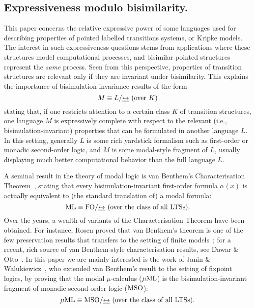 \subsection{Expressiveness modulo bisimilarity.}
%
This paper concerns the relative expressive power of some languages used for
describing properties of pointed labelled transitions systems, or Kripke
models.
The interest in such expressiveness questions stems from applications where
these structures model computational processes, and bisimilar pointed
structures represent the \emph{same} process.
Seen from this perspective, properties of transition structures are relevant
only if they are invariant under bisimilarity.
This explains the importance of bisimulation invariance results of the form
\begin{equation*}
M \equiv L / {\bis} \text{ (over $K$)}
\end{equation*}
stating that,  if one restricts attention to a certain class $K$ of transition
structures, one language $M$ is expressively complete with respect to the
relevant (i.e., bisimulation-invariant) properties that can be formulated in
another language $L$.
In this setting, generally $L$ is some rich yardstick formalism such as
first-order or monadic second-order logic, and $M$ is some modal-style
fragment of $L$, usually displaying much better computational behavior
than the full language $L$.

A seminal result in the theory of modal logic is van Benthem's Characterisation
Theorem~\cite{vanBenthemPhD}, stating that every bisimulation-invariant
first-order formula $\alpha(x)$ is actually equivalent to (the standard
translation of) a modal formula:
\begin{equation*}
\ML \equiv \fo/{\bis} \text{ (over the class of all LTSs)}.
\end{equation*}
Over the years, a wealth of variants of the Characterisation Theorem have been
obtained.
For instance, Rosen proved that van Benthem's theorem is one of the few
preservation results that transfers to the setting of finite
models~\cite{rose:moda97}; for a recent, rich source of van Benthem-style
characterisation results, see Dawar \& Otto~\cite{DawarO09}.
In this paper we are mainly interested is the work of Janin \&
Walukiewicz~\cite{Jan96}, who extended van Benthem's result to the setting
of fixpoint logics, by proving that the modal $\mu$-calculus ($\mu\mathrm{ML}$) is the
bisimulation-invariant fragment of monadic second-order
logic ($\mathrm{MSO}$):
\begin{equation*}
\MC \equiv \mso/{\bis} \text{ (over the class of all LTSs)}.
\end{equation*}

